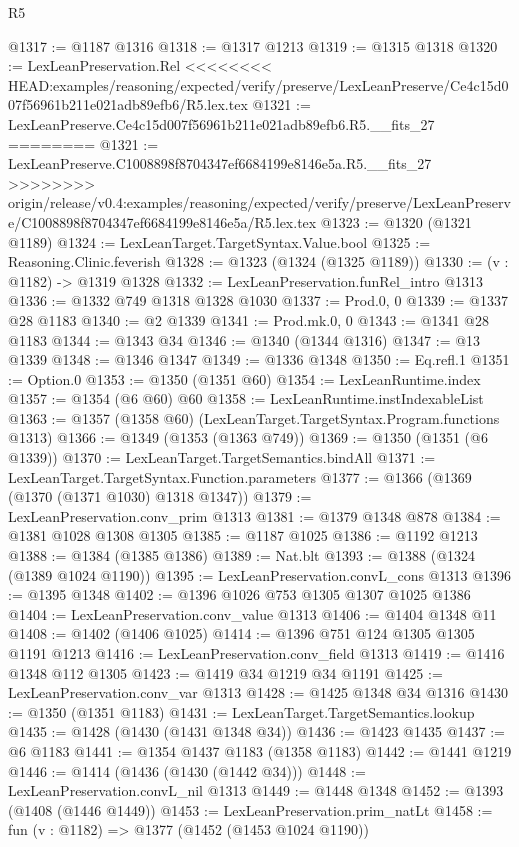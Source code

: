 \begin{lexlean}{R5}
\begin{coremodule}
{{{{{{{{{{{{{{{{{{{{{{{{{{{{{{{{{{{{{{{{{{{{{{{{{{{{{{{{{{{{{{{{{{{{{{{{{{{{{{{{{{{{@1317 := @1187 @1316
@1318 := @1317 @1213
@1319 := @1315 @1318
@1320 := LexLeanPreservation.Rel
<<<<<<<< HEAD:examples/reasoning/expected/verify/preserve/LexLeanPreserve/Ce4c15d007f56961b211e021adb89efb6/R5.lex.tex
@1321 := LexLeanPreserve.Ce4c15d007f56961b211e021adb89efb6.R5.__fits_27
========
@1321 := LexLeanPreserve.C1008898f8704347ef6684199e8146e5a.R5.__fits_27
>>>>>>>> origin/release/v0.4:examples/reasoning/expected/verify/preserve/LexLeanPreserve/C1008898f8704347ef6684199e8146e5a/R5.lex.tex
@1323 := @1320 (@1321 @1189)
@1324 := LexLeanTarget.TargetSyntax.Value.bool
@1325 := Reasoning.Clinic.feverish
@1328 := @1323 (@1324 (@1325 @1189))
@1330 := (v : @1182) -> @1319 @1328
@1332 := LexLeanPreservation.funRel_intro @1313
@1336 := @1332 @749 @1318 @1328 @1030
@1337 := Prod.{0, 0}
@1339 := @1337 @28 @1183
@1340 := @2 @1339
@1341 := Prod.mk.{0, 0}
@1343 := @1341 @28 @1183
@1344 := @1343 @34
@1346 := @1340 (@1344 @1316)
@1347 := @13 @1339
@1348 := @1346 @1347
@1349 := @1336 @1348
@1350 := Eq.refl.{1}
@1351 := Option.{0}
@1353 := @1350 (@1351 @60)
@1354 := LexLeanRuntime.index
@1357 := @1354 (@6 @60) @60
@1358 := LexLeanRuntime.instIndexableList
@1363 := @1357 (@1358 @60) (LexLeanTarget.TargetSyntax.Program.functions @1313)
@1366 := @1349 (@1353 (@1363 @749))
@1369 := @1350 (@1351 (@6 @1339))
@1370 := LexLeanTarget.TargetSemantics.bindAll
@1371 := LexLeanTarget.TargetSyntax.Function.parameters
@1377 := @1366 (@1369 (@1370 (@1371 @1030) @1318 @1347))
@1379 := LexLeanPreservation.conv_prim @1313
@1381 := @1379 @1348 @878
@1384 := @1381 @1028 @1308 @1305
@1385 := @1187 @1025
@1386 := @1192 @1213
@1388 := @1384 (@1385 @1386)
@1389 := Nat.blt
@1393 := @1388 (@1324 (@1389 @1024 @1190))
@1395 := LexLeanPreservation.convL_cons @1313
@1396 := @1395 @1348
@1402 := @1396 @1026 @753 @1305 @1307 @1025 @1386
@1404 := LexLeanPreservation.conv_value @1313
@1406 := @1404 @1348 @11
@1408 := @1402 (@1406 @1025)
@1414 := @1396 @751 @124 @1305 @1305 @1191 @1213
@1416 := LexLeanPreservation.conv_field @1313
@1419 := @1416 @1348 @112 @1305
@1423 := @1419 @34 @1219 @34 @1191
@1425 := LexLeanPreservation.conv_var @1313
@1428 := @1425 @1348 @34 @1316
@1430 := @1350 (@1351 @1183)
@1431 := LexLeanTarget.TargetSemantics.lookup
@1435 := @1428 (@1430 (@1431 @1348 @34))
@1436 := @1423 @1435
@1437 := @6 @1183
@1441 := @1354 @1437 @1183 (@1358 @1183)
@1442 := @1441 @1219
@1446 := @1414 (@1436 (@1430 (@1442 @34)))
@1448 := LexLeanPreservation.convL_nil @1313
@1449 := @1448 @1348
@1452 := @1393 (@1408 (@1446 @1449))
@1453 := LexLeanPreservation.prim_natLt
@1458 := fun (v : @1182) => @1377 (@1452 (@1453 @1024 @1190))
}}}}}}}}}}}}}}}}}}}}}}}}}}}}}}}}}}}}}}}}}}}}}}}}}}}}}}}}}}}}}}}}}}}}}}}}}}}}}}}}}}}}
\end{coremodule}
\end{lexlean}
